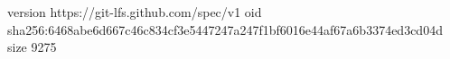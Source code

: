 version https://git-lfs.github.com/spec/v1
oid sha256:6468abe6d667c46c834cf3e5447247a247f1bf6016e44af67a6b3374ed3cd04d
size 9275
